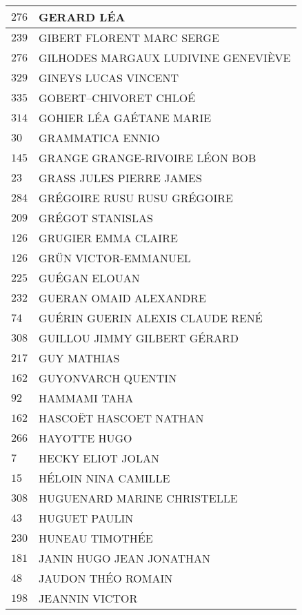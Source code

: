\begin{xltabular}{\linewidth}{|l|X|}
    $276$ & GERARD LÉA \\
    \hline
    $239$ & GIBERT FLORENT MARC SERGE \\
    \hline
    $276$ & GILHODES MARGAUX LUDIVINE GENEVIÈVE \\
    \hline
    $329$ & GINEYS LUCAS VINCENT \\
    \hline
    $335$ & GOBERT--CHIVORET CHLOÉ \\
    \hline
    $314$ & GOHIER LÉA GAÉTANE MARIE \\
    \hline
    $30$ & GRAMMATICA ENNIO \\
    \hline
    $145$ & GRANGE GRANGE-RIVOIRE LÉON BOB \\
    \hline
    $23$ & GRASS JULES PIERRE JAMES \\
    \hline
    $284$ & GRÉGOIRE RUSU RUSU GRÉGOIRE \\
    \hline
    $209$ & GRÉGOT STANISLAS \\
    \hline
    $126$ & GRUGIER EMMA CLAIRE \\
    \hline
    $126$ & GRÜN VICTOR-EMMANUEL \\
    \hline
    $225$ & GUÉGAN ELOUAN \\
    \hline
    $232$ & GUERAN OMAID ALEXANDRE \\
    \hline
    $74$ & GUÉRIN GUERIN ALEXIS CLAUDE RENÉ \\
    \hline
    $308$ & GUILLOU JIMMY GILBERT GÉRARD \\
    \hline
    $217$ & GUY MATHIAS \\
    \hline
    $162$ & GUYONVARCH QUENTIN \\
    \hline
    $92$ & HAMMAMI TAHA \\
    \hline
    $162$ & HASCOËT HASCOET NATHAN \\
    \hline
    $266$ & HAYOTTE HUGO \\
    \hline
    $7$ & HECKY ELIOT JOLAN \\
    \hline
    $15$ & HÉLOIN NINA CAMILLE \\
    \hline
    $308$ & HUGUENARD MARINE CHRISTELLE \\
    \hline
    $43$ & HUGUET PAULIN \\
    \hline
    $230$ & HUNEAU TIMOTHÉE \\
    \hline
    $181$ & JANIN HUGO JEAN JONATHAN \\
    \hline
    $48$ & JAUDON THÉO ROMAIN \\
    \hline
    $198$ & JEANNIN VICTOR \\
    \hline

\end{xltabular}
